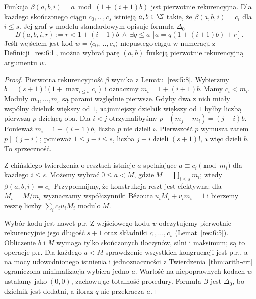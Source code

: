 \begin{lemat}\label{res:7:4}
Funkcja $\beta(a,b,i)=a\bmod(1+(i+1)b)$ jest pierwotnie rekurencyjna. Dla każdego skończonego ciągu $c_0,\ldots,c_s$ istnieją $a,b\in\N$ takie, że $\beta(a,b,i)=c_i$ dla $i\le s$. Jej graf w modelu standardowym opisuje formuła $\Delta_0$
\[
B(a,b,i,r):=r<1+(i+1)b\ \land\
\exists q\le a\,[a=q(1+(i+1)b)+r].
\]
Jeśli wejściem jest kod $w=\langle c_0,\ldots,c_s\rangle$ niepustego ciągu
w numeracji z Definicji~\ref{res:6:1}, można wybrać parę $(a,b)$
funkcją pierwotnie rekurencyjną argumentu $w$.
\end{lemat}
\begin{proof}
Pierwotna rekurencyjność $\beta$ wynika z Lematu~\ref{res:5:8}. Wybierzmy $b=(s+1)!(1+\max_{i\le s}c_i)$ i oznaczmy $m_i=1+(i+1)b$. Mamy $c_i<m_i$. Moduły $m_0,\ldots,m_s$ są parami względnie pierwsze. Gdyby dwa z nich miały wspólny dzielnik większy od $1$, najmniejszy dzielnik większy od $1$ byłby liczbą pierwszą $p$ dzielącą oba. Dla $i<j$ otrzymalibyśmy $p\mid(m_j-m_i)=(j-i)b$. Ponieważ $m_i=1+(i+1)b$, liczba $p$ nie dzieli $b$. Pierwszość $p$ wymusza zatem $p\mid(j-i)$; ponieważ $1\le j-i\le s$, liczba $j-i$ dzieli $(s+1)!$, a więc dzieli $b$. To sprzeczność.

Z chińskiego twierdzenia o resztach istnieje $a$ spełniające $a\equiv c_i\pmod{m_i}$ dla każdego $i\le s$. Możemy wybrać $0\le a<M$, gdzie $M=\prod_{i\le s}m_i$; wtedy $\beta(a,b,i)=c_i$. Przypomnijmy, że konstrukcja reszt jest efektywna: dla $M_i=M/m_i$ wyznaczamy współczynniki Bézouta $u_iM_i+v_im_i=1$ i bierzemy resztę liczby $\sum_i c_i u_iM_i$ modulo $M$.

Wybór kodu jest nawet p.r. Z wejściowego kodu $w$
odczytujemy pierwotnie rekurencyjnie jego długość $s+1$ oraz
składniki $c_0,\ldots,c_s$ (Lemat~\ref{res:6:5}).
Obliczenie $b$ i $M$ wymaga tylko skończonych iloczynów, silni
i maksimum; są to operacje p.r.
Dla każdego $a<M$ sprawdzenie wszystkich kongruencji jest p.r.,
a na mocy udowodnionego istnienia i jednoznaczności z
Twierdzenia~\ref{thm:arith-crt} ograniczona minimalizacja
wybiera jedno $a$. Wartość na niepoprawnych kodach $w$
ustalamy jako $(0,0)$, zachowując totalność procedury.
Formuła $B$ jest $\Delta_0$, bo dzielnik jest dodatni, a iloraz $q$
nie przekracza $a$.
\end{proof}

